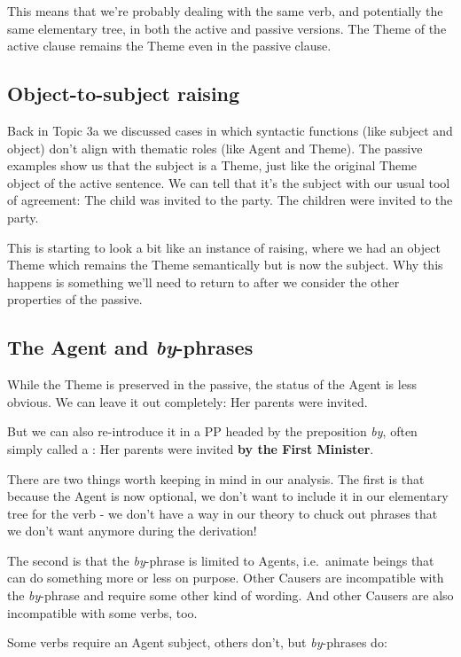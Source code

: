 \documentclass{article}
\begin{document}
This means that we're probably dealing with the same verb, and potentially the same elementary tree, in both the active and passive versions. The Theme of the active clause remains the Theme even in the passive clause.

    \subsection{Object-to-subject raising}
Back in Topic 3a we discussed cases in which syntactic functions (like subject and object) don't align with thematic roles (like Agent and Theme). The passive examples show us that the subject is a Theme, just like the original Theme object of the active sentence. We can tell that it's the subject with our usual tool of agreement:
\ea
    \ea The child was invited to the party.
    \ex The children were invited to the party.
    \z
\z

This is starting to look a bit like an instance of raising, where we had an object Theme which remains the Theme semantically but is now the subject. Why this happens is something we'll need to return to after we consider the other properties of the passive.

    \subsection{The Agent and \emph{by}-phrases}
While the Theme is preserved in the passive, the status of the Agent is less obvious. We can leave it out completely:
\ea Her parents were invited.
\z

But we can also re-introduce it in a PP headed by the preposition \emph{by}, often simply called a :
\ea Her parents were invited \textbf{by the First Minister}.
\z

There are two things worth keeping in mind in our analysis. The first is that because the Agent is now optional, we don't want to include it in our elementary tree for the verb - we don't have a way in our theory to chuck out phrases that we don't want anymore during the derivation!

The second is that the \emph{by}-phrase is limited to Agents, i.e.~animate beings that can do something more or less on purpose. Other Causers are incompatible with the \emph{by}-phrase and require some other kind of wording. And other Causers are also incompatible with some verbs, too.

Some verbs require an Agent subject, others don't, but \emph{by}-phrases do:
\ea
    \z
\ex
    \z
\ex
    \z
\z
\end{document}
